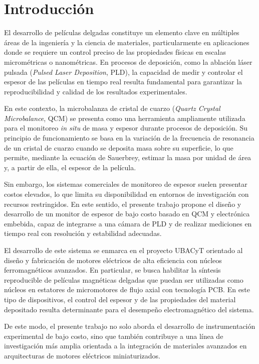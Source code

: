\documentclass{article}
\begin{document}
\newpage


\section{Introducción}

El desarrollo de películas delgadas constituye un elemento clave en múltiples áreas de la ingeniería y la ciencia de materiales, particularmente en aplicaciones donde se requiere un control preciso de las propiedades físicas en escalas micrométricas o nanométricas. En procesos de deposición, como la ablación láser pulsada (\textit{Pulsed Laser Deposition}, PLD), la capacidad de medir y controlar el espesor de las películas en tiempo real resulta fundamental para garantizar la reproducibilidad y calidad de los resultados experimentales.

En este contexto, la microbalanza de cristal de cuarzo (\textit{Quartz Crystal Microbalance}, QCM) se presenta como una herramienta ampliamente utilizada para el monitoreo \textit{in situ} de masa y espesor durante procesos de deposición. Su principio de funcionamiento se basa en la variación de la frecuencia de resonancia de un cristal de cuarzo cuando se deposita masa sobre su superficie, lo que permite, mediante la ecuación de Sauerbrey, estimar la masa por unidad de área y, a partir de ella, el espesor de la película.

Sin embargo, los sistemas comerciales de monitoreo de espesor suelen presentar costos elevados, lo que limita su disponibilidad en entornos de investigación con recursos restringidos. En este sentido, el presente trabajo propone el diseño y desarrollo de un monitor de espesor de bajo costo basado en QCM y electrónica embebida, capaz de integrarse a una cámara de PLD y de realizar mediciones en tiempo real con resolución y estabilidad adecuadas.

El desarrollo de este sistema se enmarca en el proyecto UBACyT orientado al diseño y fabricación de motores eléctricos de alta eficiencia con núcleos ferromagnéticos avanzados. En particular, se busca habilitar la síntesis reproducible de películas magnéticas delgadas que puedan ser utilizadas como núcleos en estatores de micromotores de flujo axial con tecnología PCB. En este tipo de dispositivos, el control del espesor y de las propiedades del material depositado resulta determinante para el desempeño electromagnético del sistema.

De este modo, el presente trabajo no solo aborda el desarrollo de instrumentación experimental de bajo costo, sino que también contribuye a una línea de investigación más amplia orientada a la integración de materiales avanzados en arquitecturas de motores eléctricos miniaturizados.
\end{document}

